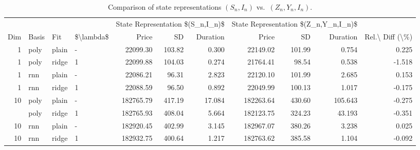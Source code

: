 \begin{table}

\caption{\label{tab:tab:state_representation}Comparison of state representations $(S_n,I_n)$ vs.\ $(Z_n,Y_n,I_n)$.}
\centering
\begin{tabular}[t]{rlllrrrrrrr}
\toprule
\multicolumn{4}{c}{ } & \multicolumn{3}{c}{State Representation \$(S\_n,I\_n)\$} & \multicolumn{3}{c}{State Representation \$(Z\_n,Y\_n,I\_n)\$} & \multicolumn{1}{c}{ } \\
\cmidrule(l{3pt}r{3pt}){5-7} \cmidrule(l{3pt}r{3pt}){8-10}
Dim & Basis & Fit & \$\textbackslash{}lambda\$ & Price & SD & Duration & Price & SD & Duration & Rel.\textbackslash{} Diff (\textbackslash{}\%)\\
\midrule
1 & poly & plain & - & 22099.30 & 103.82 & 0.300 & 22149.02 & 101.99 & 0.754 & 0.225\\
1 & poly & ridge & 1 & 22099.88 & 104.03 & 0.274 & 21764.41 & 98.54 & 0.538 & -1.518\\
1 & rnn & plain & - & 22086.21 & 96.31 & 2.823 & 22120.10 & 101.99 & 2.685 & 0.153\\
1 & rnn & ridge & 1 & 22088.59 & 96.50 & 0.892 & 22049.99 & 100.13 & 1.017 & -0.175\\
10 & poly & plain & - & 182765.79 & 417.19 & 17.084 & 182263.64 & 430.60 & 105.643 & -0.275\\
\addlinespace
10 & poly & ridge & 1 & 182765.93 & 408.04 & 5.664 & 182123.75 & 324.23 & 43.193 & -0.351\\
10 & rnn & plain & - & 182920.45 & 402.99 & 3.145 & 182967.07 & 380.26 & 3.238 & 0.025\\
10 & rnn & ridge & 1 & 182932.75 & 400.64 & 1.217 & 182763.62 & 385.58 & 1.104 & -0.092\\
\bottomrule
\end{tabular}
\end{table}
